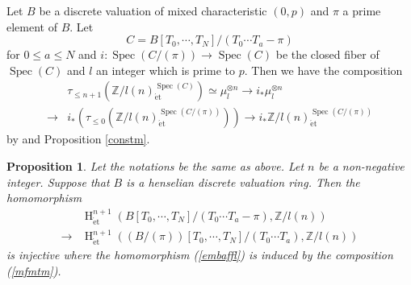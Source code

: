 \documentclass{article}
\newtheorem{prop}[thm]{\indent \sc Proposition}
\newcommand{\spec}{\operatorname{Spec}}
\newcommand{\et}{\mathrm{\acute{e}t}}
\newcommand{\HO}{\operatorname{H}}
\begin{document}
Let $B$ be a discrete valuation of mixed characteristic $(0, p)$ and 
$\pi$ a prime element of $B$. Let 
%
\begin{equation*}
C=
B[
T_{0}, \cdots, T_{N}
]/
(
T_{0}\cdots T_{a}-\pi
)
\end{equation*}
%
for $0\leq a\leq N$ and
%
\begin{math}
i: \spec(
C/(\pi)
)
\to
\spec(
C
)
\end{math}
%
be the closed fiber of 
$\spec(C)$
and
$l$ an integer which is prime to $p$. Then we have the composition
%
\begin{align}\label{mfmtm}
&\tau_{\leq n+1}(
\mathbb{Z}/l(n)_{\et}^{\spec(C)}
)    
\simeq 
\mu_{l}^{\otimes n}
\to
i_{*}\mu_{l}^{\otimes n}  \nonumber 
\\
\to
&i_{*}\left(
\tau_{\leq 0}(\mathbb{Z}/l(n)_{\et}^{\spec(C/(\pi))}
)
\right)
\to 
i_{*}\mathbb{Z}/l(n)_{\et}^{\spec(C/(\pi))}
\end{align}
%
by \cite[Remark 4.7]{Sak4} and Proposition \ref{constm}.
%
\begin{prop}\upshape\label{fscH}
Let the notations be the same as above. Let $n$ be a non-negative integer.
Suppose that $B$ is a henselian discrete valuation ring. 
Then the homomorphism
%
\begin{align}\label{embaffl}
&\HO^{n+1}_{\et}(
B[T_{0}, \cdots, T_{N}]/(T_{0}\cdots T_{a}-\pi),
\mathbb{Z}/l(n)
)  \nonumber
\\    
\to
&\HO^{n+1}_{\et}\left(
(B/(\pi))[T_{0}, \cdots, T_{N}]/(T_{0}\cdots T_{a}),
\mathbb{Z}/l(n)
\right)
\end{align}
%
is injective where the homomorphism (\ref{embaffl}) is induced by the composition (\ref{mfmtm}).
\end{prop}
%
\end{document}
